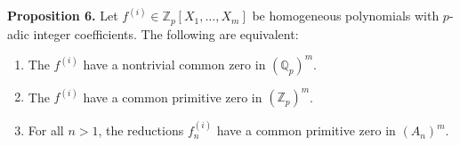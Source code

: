 \textbf{Proposition 6.} Let $f^{(i)} \in \mathbb{Z}_p[X_1, \ldots, X_m]$ be homogeneous polynomials with $p$-adic integer coefficients. The following are equivalent:
\begin{enumerate}
\item[(a)] The $f^{(i)}$ have a nontrivial common zero in $(\mathbb{Q}_p)^m$.
\item[(b)] The $f^{(i)}$ have a common primitive zero in $(\mathbb{Z}_p)^m$.
\item[(c)] For all $n > 1$, the reductions $f_n^{(i)}$ have a common primitive zero in $(A_n)^m$.
\end{enumerate}

